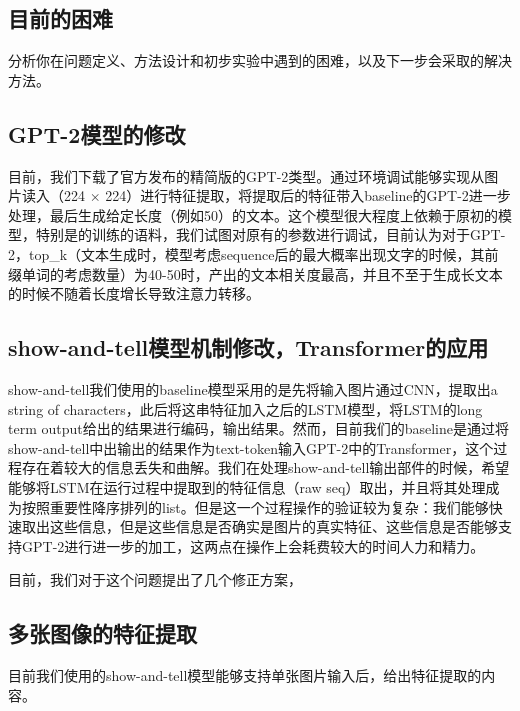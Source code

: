 \documentclass{article}
\begin{document}
\begin{CJK*}{UTF8}{gbsn}
\section{目前的困难}

分析你在问题定义、方法设计和初步实验中遇到的困难，以及下一步会采取的解决方法。
\subsection{GPT-2模型的修改}
\par{
目前，我们下载了官方发布的精简版的GPT-2类型。通过环境调试能够实现从图片读入（224 $ \times $ 224）进行特征提取，将提取后的特征带入baseline的GPT-2进一步处理，最后生成给定长度（例如50）的文本。这个模型很大程度上依赖于原初的模型，特别是的训练的语料，我们试图对原有的参数进行调试，目前认为对于GPT-2，top\_k（文本生成时，模型考虑sequence后的最大概率出现文字的时候，其前缀单词的考虑数量）为40-50时，产出的文本相关度最高，并且不至于生成长文本的时候不随着长度增长导致注意力转移。
}

\subsection{show-and-tell模型机制修改，Transformer的应用}
\par{show-and-tell我们使用的baseline模型采用的是先将输入图片通过CNN，提取出a string of characters，此后将这串特征加入之后的LSTM模型，将LSTM的long term output给出的结果进行编码，输出结果。然而，目前我们的baseline是通过将show-and-tell中出输出的结果作为text-token输入GPT-2中的Transformer，这个过程存在着较大的信息丢失和曲解。我们在处理show-and-tell输出部件的时候，希望能够将LSTM在运行过程中提取到的特征信息（raw seq）取出，并且将其处理成为按照重要性降序排列的list。但是这一个过程操作的验证较为复杂：我们能够快速取出这些信息，但是这些信息是否确实是图片的真实特征、这些信息是否能够支持GPT-2进行进一步的加工，这两点在操作上会耗费较大的时间人力和精力。
}
\par{目前，我们对于这个问题提出了几个修正方案，
}

\subsection{多张图像的特征提取}
\par{目前我们使用的show-and-tell模型能够支持单张图片输入后，给出特征提取的内容。
}


\end{CJK*}
\end{document}
